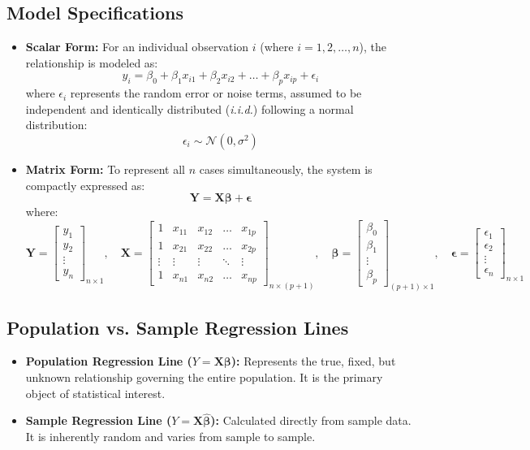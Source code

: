 \documentclass{article}
\begin{document}
\subsection{Model Specifications}
\begin{itemize}
    \item \textbf{Scalar Form:} For an individual observation $i$ (where $i = 1, 2, \dots, n$), the relationship is modeled as:
    $$y_i = \beta_0 + \beta_1 x_{i1} + \beta_2 x_{i2} + \dots + \beta_p x_{ip} + \epsilon_i$$
    where $\epsilon_i$ represents the random error or noise terms, assumed to be independent and identically distributed (\textit{i.i.d.}) following a normal distribution:
    $$\epsilon_i \sim \mathcal{N}(0, \sigma^2)$$
    \item \textbf{Matrix Form:} To represent all $n$ cases simultaneously, the system is compactly expressed as:
    $$\mathbf{Y} = \mathbf{X}\boldsymbol{\beta} + \boldsymbol{\epsilon}$$
    where:
    $$\mathbf{Y} = \begin{bmatrix} y_1 \\ y_2 \\ \vdots \\ y_n \end{bmatrix}_{n \times 1}, \quad 
    \mathbf{X} = \begin{bmatrix} 1 & x_{11} & x_{12} & \dots & x_{1p} \\ 1 & x_{21} & x_{22} & \dots & x_{2p} \\ \vdots & \vdots & \vdots & \ddots & \vdots \\ 1 & x_{n1} & x_{n2} & \dots & x_{np} \end{bmatrix}_{n \times (p+1)}, \quad
    \boldsymbol{\beta} = \begin{bmatrix} \beta_0 \\ \beta_1 \\ \vdots \\ \beta_p \end{bmatrix}_{(p+1) \times 1}, \quad
    \boldsymbol{\epsilon} = \begin{bmatrix} \epsilon_1 \\ \epsilon_2 \\ \vdots \\ \epsilon_n \end{bmatrix}_{n \times 1}$$
\end{itemize}

\subsection{Population vs. Sample Regression Lines}
\begin{itemize}
    \item \textbf{Population Regression Line ($Y = \mathbf{X}\boldsymbol{\beta}$):} Represents the true, fixed, but unknown relationship governing the entire population. It is the primary object of statistical interest.
    \item \textbf{Sample Regression Line ($Y = \mathbf{X}\hat{\boldsymbol{\beta}}$):} Calculated directly from sample data. It is inherently random and varies from sample to sample.
\end{itemize}
\end{document}
